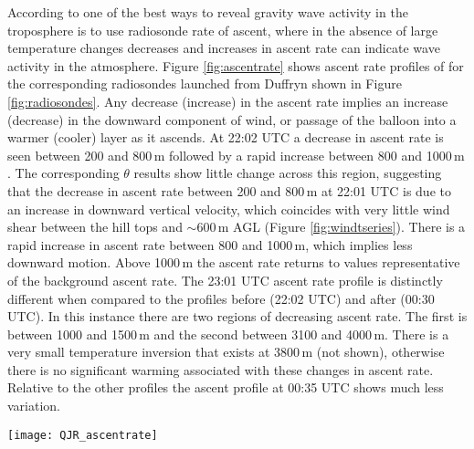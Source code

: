 \documentclass[times]{qjrms4}
\begin{document}
According to \citet{lalas1980tropospheric} one of the best ways to reveal gravity wave activity in the troposphere is to use radiosonde rate of ascent, where in the absence of large temperature changes decreases and increases in ascent rate can indicate wave activity in the atmosphere. Figure \ref{fig:ascentrate} shows ascent rate profiles of for the corresponding radiosondes launched from Duffryn shown in Figure \ref{fig:radiosondes}. Any decrease (increase) in the ascent rate implies an increase (decrease) in the downward component of wind, or passage of the balloon into a warmer (cooler) layer as it ascends. At 22:02 UTC a decrease in ascent rate is seen between 200 and 800$\,\mbox{m}$ followed by a rapid increase between 800 and 1000$\,\mbox{m}$. The corresponding $\theta$ results show little change across this region, suggesting that the decrease in ascent rate between 200 and 800$\,\mbox{m}$ at 22:01 UTC is due to an increase in downward vertical velocity, which coincides with very little wind shear between the hill tops and $\sim$600$\,\mbox{m}$ AGL (Figure \ref{fig:windtseries}). There is a rapid increase in ascent rate between 800 and 1000$\,\mbox{m}$, which implies less downward motion. Above 1000$\,\mbox{m}$ the ascent rate returns to values representative of the background ascent rate. The 23:01 UTC ascent rate profile is distinctly different when compared to the profiles before (22:02 UTC) and after (00:30 UTC). In this instance there are two regions of decreasing ascent rate. The first is between 1000 and 1500$\,\mbox{m}$ and the second between 3100 and 4000$\,\mbox{m}$. There is a very small temperature inversion that exists at 3800$\,\mbox{m}$ (not shown), otherwise there is no significant warming associated with these changes in ascent rate. Relative to the other profiles the ascent profile at 00:35 UTC shows much less variation.
%
       \begin{figure*}
        \centering
        \texttt{[image: QJR\_ascentrate]}
        \caption{Radiosonde rate of ascent for profiles launched from Duffryn at 22:02, 23:01 and 00:30 UTC.}
        \label{fig:ascentrate}
        \end{figure*}
\end{document}
